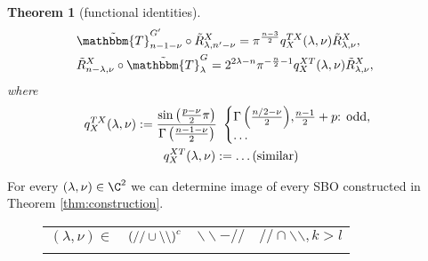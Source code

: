 \documentclass[portrait,final,paperwidth=90cm,paperheight=120cm,fontscale=0.3]{baposter}
\newcommand{\same}{\dots\mbox{(similar)}}
\newcommand{\assign}{:=}
\newcommand{\mybox}[2]{
	\begin{tcolorbox}[colback=green!5,colframe=green!40!black,title=#1]#2\end{tcolorbox}
}
\newtheorem{theorem}{Theorem}
\theoremstyle{definition}
\newcommand{\todd}{\mbox{\textrm{: odd}}}
\begin{document}
\begin{poster}
{\begin{theorem}[functional identities]
\begin{eqnarray}
    & \tilde{\mathbbm{T}}^{G'}_{n-1 - \nu} \circ \tilde{R}^X_{\lambda, n' - \nu} =\pi^{\frac{n - 3}{2}} q^{T X}_X
  (\lambda, \nu) \tilde{R}^X_{\lambda, \nu}, &  \nonumber\\
  & \tilde{R}_{n - \lambda, \nu}^X \circ \tilde{\mathbbm{T}}^G_{\lambda} =2^{2\lambda-n}\pi^{-\frac{n}{2}-1} q^{X T}_X
  (\lambda, \nu) \tilde{R}_{\lambda, \nu}^X, &  \nonumber
  \end{eqnarray}
  where
  \begin{gather*}
  q^{T X}_X (\lambda, \nu) \assign\frac{\sin\left( \frac{p-\nu}{2} \pi\right)}{\Gamma\left( \frac{n-1-\nu}{2} \right)} \ \left\{
	  \begin{array}{@{}l@{}l}
    {\Gamma\left( \frac{n / 2 - \nu}{2} \right)}, & \frac{n - 1}{2}+p\todd,\\
    \dots&
  \end{array} \right.\\
  q^{X T}_X (\lambda, \nu) \assign\same
\end{gather*}
	\end{theorem}
}
{
	For every $(\lambda,\nu)\in\C^2$ we can determine image of every SBO constructed in Theorem \ref{thm:construction}.
	\mybox{{Example: $p$: even, $q$: odd, $\nu\in-\N$}}{{\tiny
      \begin{figure}[H]
	      \hspace{-0.5cm}
	      \noindent\begin{tabular}{@{}m{1.6cm}@{}c@{}c@{}c@{}}
	      $(\lambda,\nu)\in$&$\left(//\cup\backslash\backslash\right)^c$ & $\backslash\backslash-//$  & $//\cap\backslash\backslash,k> l$\\
	      &
      \end{tabular}
      \end{figure}
      }}
}

\end{poster}
\end{document}
